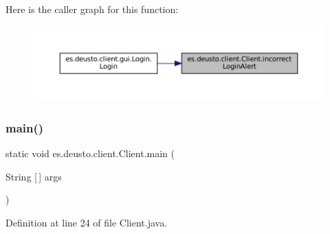 Here is the caller graph for this function\+:\nopagebreak
\begin{figure}[H]
\begin{center}
\leavevmode
\includegraphics[width=350pt]{classes_1_1deusto_1_1client_1_1_client_a8bbc4a71a4aaff50bfe419a724898790_icgraph}
\end{center}
\end{figure}
\mbox{\label{classes_1_1deusto_1_1client_1_1_client_a69a7526d0af9cb2341f4bf341b501152}} 
\subsubsection{\texorpdfstring{main()}{main()}}
{\footnotesize\ttfamily static void es.\+deusto.\+client.\+Client.\+main (\begin{DoxyParamCaption}\item[{String \mbox{[}$\,$\mbox{]}}]{args }\end{DoxyParamCaption})\hspace{0.3cm}{\ttfamily [static]}}



Definition at line 24 of file Client.\+java.

